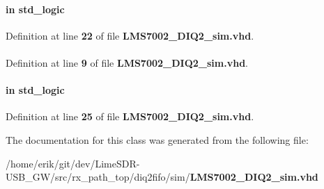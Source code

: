 \paragraph[{reset\+\_\+n}]{ {\bfseries \textcolor{keywordflow}{in}\textcolor{vhdlchar}{ }} {\bfseries \textcolor{comment}{std\+\_\+logic}\textcolor{vhdlchar}{ }} \hspace{0.3cm}{\ttfamily [Port]}}\label{classLMS7002__DIQ2__sim_a446ea52ed8c4a84181a47d9165ce41a5}


Definition at line {\bf 22} of file {\bf L\+M\+S7002\+\_\+\+D\+I\+Q2\+\_\+sim.\+vhd}.

\paragraph[{std\+\_\+logic\+\_\+1164}]{\hspace{0.3cm}{\ttfamily [Package]}}\label{classLMS7002__DIQ2__sim_acd03516902501cd1c7296a98e22c6fcb}


Definition at line {\bf 9} of file {\bf L\+M\+S7002\+\_\+\+D\+I\+Q2\+\_\+sim.\+vhd}.

\paragraph[{trxiqpulse}]{ {\bfseries \textcolor{keywordflow}{in}\textcolor{vhdlchar}{ }} {\bfseries \textcolor{comment}{std\+\_\+logic}\textcolor{vhdlchar}{ }} \hspace{0.3cm}{\ttfamily [Port]}}\label{classLMS7002__DIQ2__sim_a808d6d382f3c6a02784a160f67d0f891}


Definition at line {\bf 25} of file {\bf L\+M\+S7002\+\_\+\+D\+I\+Q2\+\_\+sim.\+vhd}.



The documentation for this class was generated from the following file\+:\begin{DoxyCompactItemize}
\item 
/home/erik/git/dev/\+Lime\+S\+D\+R-\/\+U\+S\+B\+\_\+\+G\+W/src/rx\+\_\+path\+\_\+top/diq2fifo/sim/{\bf L\+M\+S7002\+\_\+\+D\+I\+Q2\+\_\+sim.\+vhd}\end{DoxyCompactItemize}
